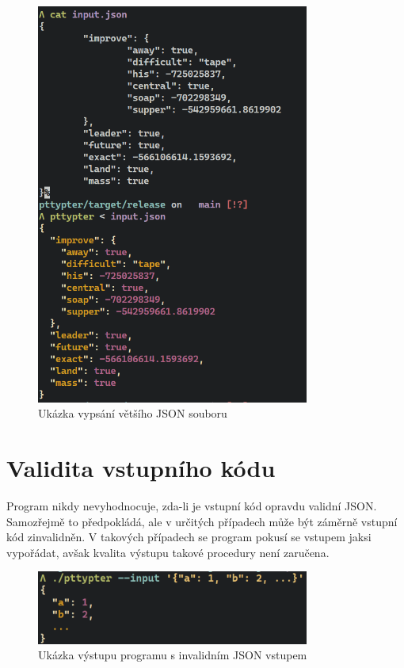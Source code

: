 \documentclass[11pt, letterpaper]{article}
\begin{document}
\begin{figure}[H]
    \begin{center}
        \includegraphics[width=0.8\textwidth]{term4}
    \end{center}
    \caption{Ukázka vypsání většího JSON souboru}
\end{figure}

\section{Validita vstupního kódu}
Program nikdy nevyhodnocuje, zda-li je vstupní kód opravdu validní JSON. Samozřejmě to předpokládá, ale v určitých případech může být záměrně vstupní kód zinvalidněn. V takových případech se program pokusí se vstupem jaksi vypořádat, avšak kvalita výstupu takové procedury není zaručena.

\begin{figure}[H]
    \begin{center}
        \includegraphics[width=0.8\textwidth]{term3}
    \end{center}
    \caption{Ukázka výstupu programu s invalidním JSON vstupem}
\end{figure}
\end{document}
